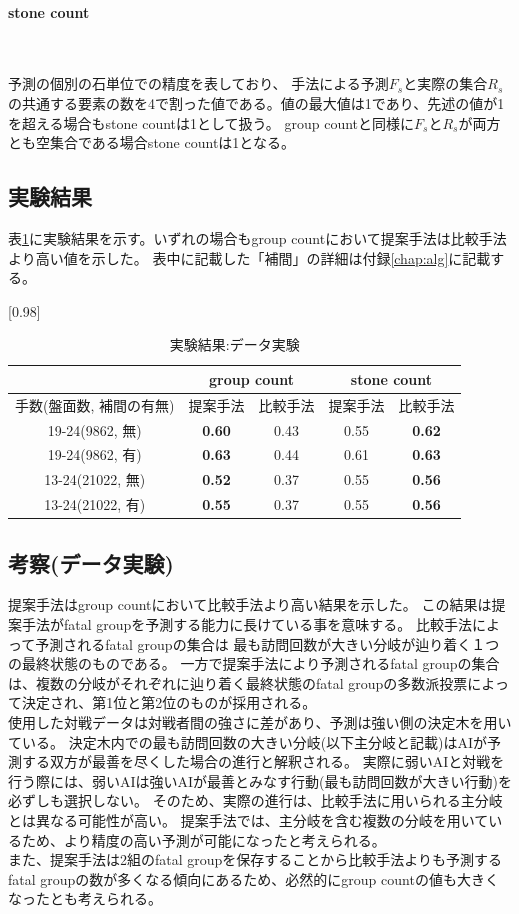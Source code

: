 \paragraph{stone count}~
\par 予測の個別の石単位での精度を表しており、
手法による予測$F_s$と実際の集合$R_s$の共通する要素の数を4で割った値である。値の最大値は1であり、先述の値が1を超える場合もstone countは1として扱う。
group countと同様に$F_s$と$R_s$が両方とも空集合である場合stone countは1となる。
\subsection{実験結果}


表\ref{table:result-online}に実験結果を示す。いずれの場合もgroup countにおいて提案手法は比較手法より高い値を示した。
表中に記載した「補間」の詳細は付録\ref{chap:alg}に記載する。
\begin{table}[H]
	\caption{実験結果:データ実験}
	\centering
	\scalebox{0.98}[0.98]{
		\begin{tabular}{c|c|c|c|c}
			\multicolumn{1}{c}{} & \multicolumn{2}{|c|}{group count} 
			& \multicolumn{2}{c|}{stone count}\\ \hline \hline
			手数(盤面数, 補間の有無)    & 提案手法 & 比較手法 & 提案手法 & 比較手法 \\ \hline
			19-24(9862, 無)    & \bf{0.60} & 0.43 & 0.55 & \bf{0.62} \\
			19-24(9862, 有)    & \bf{0.63} & 0.44 & 0.61 & \bf{0.63}  \\
			13-24(21022, 無)   & \bf{0.52} & 0.37 & 0.55 & \bf{0.56}  \\
			13-24(21022, 有)   & \bf{0.55} & 0.37 & 0.55 & \bf{0.56}  \\
		\end{tabular}
	}
	\label{table:result-online}
\end{table}
\subsection{考察(データ実験)}
提案手法はgroup countにおいて比較手法より高い結果を示した。
この結果は提案手法がfatal groupを予測する能力に長けている事を意味する。
比較手法によって予測されるfatal groupの集合は
最も訪問回数が大きい分岐が辿り着く１つの最終状態のものである。
一方で提案手法により予測されるfatal groupの集合は、複数の分岐がそれぞれに辿り着く最終状態のfatal groupの多数派投票によって決定され、第1位と第2位のものが採用される。\\
使用した対戦データは対戦者間の強さに差があり、予測は強い側の決定木を用いている。
決定木内での最も訪問回数の大きい分岐(以下主分岐と記載)はAIが予測する双方が最善を尽くした場合の進行と解釈される。
実際に弱いAIと対戦を行う際には、弱いAIは強いAIが最善とみなす行動(最も訪問回数が大きい行動)を必ずしも選択しない。
そのため、実際の進行は、比較手法に用いられる主分岐とは異なる可能性が高い。
提案手法では、主分岐を含む複数の分岐を用いているため、より精度の高い予測が可能になったと考えられる。\\
また、提案手法は2組のfatal groupを保存することから比較手法よりも予測するfatal groupの数が多くなる傾向にあるため、必然的にgroup countの値も大きくなったとも考えられる。


